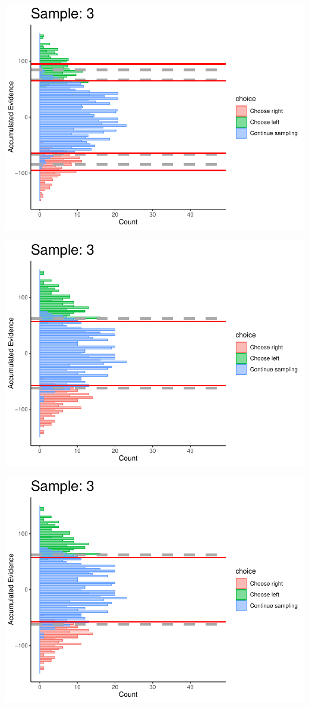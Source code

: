 \documentclass[
]{book}
\begin{document}
\begin{center}\includegraphics[width=0.8\linewidth]{LateNightBayes_files/figure-latex/collapsing_dcb-20} \end{center}

\begin{center}\includegraphics[width=0.8\linewidth]{LateNightBayes_files/figure-latex/collapsing_dcb-21} \end{center}

\begin{center}\includegraphics[width=0.8\linewidth]{LateNightBayes_files/figure-latex/collapsing_dcb-22} \end{center}
\end{document}

